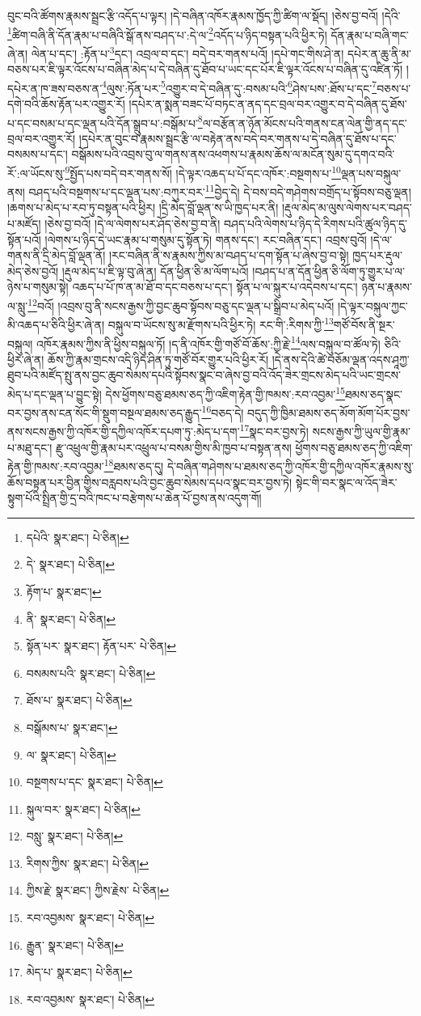 བུང་བའི་ཚོགས་རྣམས་སྦྲང་རྩི་འདོད་པ་ལྟར། །དེ་བཞིན་འཁོར་རྣམས་ཁྱོད་ཀྱི་ཚིག་ལ་སྡོད། །ཅེས་བྱ་བའོ། །དེའི་\footnote{དཔེའི་  སྣར་ཐང་།  པེ་ཅིན། }ཚིག་བཞི་ནི་དོན་རྣམ་པ་བཞིའི་སྒོ་ནས་བཤད་པ་:དེ་ལ་\footnote{དེ་  སྣར་ཐང་།  པེ་ཅིན། }འདོད་པ་ཉིད་བསྟན་པའི་ཕྱིར་ཏེ། དོན་རྣམ་པ་བཞི་གང་ཞེ་ན། ལེན་པ་དང་། :རྟོན་པ་\footnote{རྟོག་པ་  སྣར་ཐང་། }དང་། འབྲལ་བ་དང་། བདེ་བར་གནས་པའོ། །དཔེ་གང་གིས་ཤེ་ན། དཔེར་ན་ཆུ་ནི་མ་བཅས་པར་ཇི་ལྟར་འོངས་པ་བཞིན་མེད་པ་དེ་བཞིན་དུ་ཐོབ་པ་ཡང་དང་པོར་ཇི་ལྟར་འོངས་པ་བཞིན་དུ་འཛིན་ཏོ། །དཔེར་ན་ཁ་ཟས་བཅས་ན་\footnote{ནི་  སྣར་ཐང་།  པེ་ཅིན། }ལུས་:ཏོན་པར་\footnote{སྟོན་པར་  སྣར་ཐང་། རྟོན་པར་  པེ་ཅིན། }འགྱུར་བ་དེ་བཞིན་དུ་:བསམ་པའི་\footnote{བསམས་པའི་  སྣར་ཐང་།  པེ་ཅིན། }ཤེས་པས་:ཐོས་པ་དང་\footnote{ཐོས་པ་  སྣར་ཐང་།  པེ་ཅིན། }བཅས་པ་དགེ་བའི་ཆོས་རྟོན་པར་འགྱུར་རོ། །དཔེར་ན་སྨན་བཟང་པོ་བཏང་ན་ནད་དང་བྲལ་བར་འགྱུར་བ་དེ་བཞིན་དུ་ཐོས་པ་དང་བསམ་པ་དང་ལྡན་པའི་དོན་སྒྲུབ་པ་:བསྒོམ་པ་\footnote{བསྒོམས་པ་  སྣར་ཐང་། }ལ་བརྩོན་ན་ཉོན་མོངས་པའི་གནས་ངན་ལེན་གྱི་ནད་དང་བྲལ་བར་འགྱུར་རོ། །དཔེར་ན་བུང་བ་རྣམས་སྦྲང་རྩི་ལ་བརྟེན་ནས་བདེ་བར་གནས་པ་དེ་བཞིན་དུ་ཐོས་པ་དང་བསམས་པ་དང་། བསྒོམས་པའི་འབྲས་བུ་ལ་གནས་ནས་འཕགས་པ་རྣམས་ཆོས་ལ་མངོན་སུམ་དུ་དགའ་བའི་རོ་:ལ་ཡོངས་སུ་\footnote{ལ་  སྣར་ཐང་།  པེ་ཅིན། }སྤྱོད་པས་བདེ་བར་གནས་སོ། །དེ་ལྟར་འཆད་པ་པོ་དང་འཁོར་:བསྔགས་པ་\footnote{བསྔགས་པ་དང་  སྣར་ཐང་།  པེ་ཅིན། }ལྡན་པས་བསྐུལ་ནས། བཤད་པའི་བསྔགས་པ་དང་ལྡན་པས་:བཀུར་བར་\footnote{སྐུལ་བར་  སྣར་ཐང་།  པེ་ཅིན། }བྱེད་དེ། དེ་བས་བདེ་གཤེགས་བགྲོད་པ་སྟོབས་བཅུ་ལྡན། །ཆགས་པ་མེད་པ་རབ་ཏུ་བསྟན་པའི་ཕྱིར། །དྲི་མེད་བློ་ལྡན་ས་ཡི་ཁྱད་པར་ནི། །རྡུལ་མེད་མ་ལུས་ལེགས་པར་བཤད་པ་མཛོད། །ཅེས་བྱ་བའོ། །དེ་ལ་ལེགས་པར་ཤོད་ཅེས་བྱ་བ་ནི། བཤད་པའི་ལེགས་པ་ཉིད་དེ་རིགས་པའི་ཚུལ་ཉིད་དུ་སྟོན་པའོ། །ལེགས་པ་ཉིད་དེ་ཡང་རྣམ་པ་གསུམ་དུ་སྟོན་ཏེ། གནས་དང་། རང་བཞིན་དང་། འབྲས་བུའོ། །དེ་ལ་གནས་ནི་དྲི་མེད་བློ་ལྡན་ནོ། །རང་བཞིན་ནི་ས་རྣམས་ཀྱིས་མ་བཤད་པ་དག་སྟོན་པ་ཞེས་བྱ་བ་སྟེ། ཁྱད་པར་རྡུལ་མེད་ཅེས་བྱའོ། །རྡུལ་མེད་པ་ཇི་ལྟ་བུ་ཞེ་ན། དོན་ཕྱིན་ཅི་མ་ལོག་པའོ། །བཤད་པ་ན་དོན་ཕྱིན་ཅི་ལོག་ཏུ་གྱུར་པ་ལ་ཉེས་པ་གསུམ་སྟེ། འཆད་པ་པོ་ཁ་ན་མ་ཐོ་བ་དང་བཅས་པ་དང་། སྟོན་པ་ལ་སྐུར་པ་འདེབས་པ་དང་། ཉན་པ་རྣམས་ལ་སླུ་\footnote{བསླུ་  སྣར་ཐང་།  པེ་ཅིན། }བའོ། །འབྲས་བུ་ནི་སངས་རྒྱས་ཀྱི་བྱང་ཆུབ་སྟོབས་བཅུ་དང་ལྡན་པ་སྒྲིབ་པ་མེད་པའོ། །དེ་ལྟར་བསྐུལ་ཀྱང་མི་འཆད་པ་ཅིའི་ཕྱིར་ཞེ་ན། བསྐུལ་བ་ཡོངས་སུ་མ་རྫོགས་པའི་ཕྱིར་ཏེ། རང་གི་:རིགས་ཀྱི་\footnote{རིགས་ཀྱིས་  སྣར་ཐང་།  པེ་ཅིན། }གཙོ་བོས་ནི་སྔར་བསྐུལ། འཁོར་རྣམས་ཀྱིས་ནི་ཕྱིས་བསྐུལ་ཏོ། །ད་ནི་འཁོར་གྱི་གཙོ་བོ་ཆོས་:ཀྱི་རྗེ་\footnote{ཀྱིས་རྗེ་  སྣར་ཐང་། ཀྱིས་རྗེས་  པེ་ཅིན། }ལས་བསྐུལ་བ་ཚོལ་ཏེ། ཅིའི་ཕྱིར་ཞེ་ན། ཆོས་ཀྱི་རྣམ་གྲངས་འདི་ཉིད་ཤིན་ཏུ་གཙོ་བོར་གྱུར་པའི་ཕྱིར་རོ། །དེ་ནས་དེའི་ཚེ་བཅོམ་ལྡན་འདས་ཤཱཀྱ་ཐུབ་པའི་མཛོད་སྤུ་ནས་བྱང་ཆུབ་སེམས་དཔའི་སྟོབས་སྣང་བ་ཞེས་བྱ་བའི་འོད་ཟེར་གྲངས་མེད་པའི་ཡང་གྲངས་མེད་པ་དང་ལྡན་པ་བྱུང་སྟེ། དེས་ཕྱོགས་བཅུ་ཐམས་ཅད་ཀྱི་འཇིག་རྟེན་གྱི་ཁམས་:རབ་འབྱམ་\footnote{རབ་འབྱམས་  སྣར་ཐང་།  པེ་ཅིན། }ཐམས་ཅད་སྣང་བར་བྱས་ནས་ངན་སོང་གི་སྡུག་བསྔལ་ཐམས་ཅད་རྒྱུད་\footnote{རྒྱུན་  སྣར་ཐང་།  པེ་ཅིན། }བཅད་དེ། བདུད་ཀྱི་ཁྱིམ་ཐམས་ཅད་མོག་མོག་པོར་བྱས་ནས་སངས་རྒྱས་ཀྱི་འཁོར་གྱི་དཀྱིལ་འཁོར་དཔག་ཏུ་:མེད་པ་དག་\footnote{མེད་པ་  སྣར་ཐང་།  པེ་ཅིན། }སྣང་བར་བྱས་ཏེ། སངས་རྒྱས་ཀྱི་ཡུལ་གྱི་རྣམ་པ་མཐུ་དང་། རྫུ་འཕྲུལ་གྱི་རྣམ་པར་འཕྲུལ་པ་བསམ་གྱིས་མི་ཁྱབ་པ་བསྟན་ནས། ཕྱོགས་བཅུ་ཐམས་ཅད་ཀྱི་འཇིག་རྟེན་གྱི་ཁམས་:རབ་འབྱམ་\footnote{རབ་འབྱམས་  སྣར་ཐང་།  པེ་ཅིན། }ཐམས་ཅད་དུ། དེ་བཞིན་གཤེགས་པ་ཐམས་ཅད་ཀྱི་འཁོར་གྱི་དཀྱིལ་འཁོར་རྣམས་སུ་ཆོས་བསྟན་པར་བྱིན་གྱིས་བརླབས་པའི་བྱང་ཆུབ་སེམས་དཔའ་སྣང་བར་བྱས་ཏེ། སྟེང་གི་བར་སྣང་ལ་འོད་ཟེར་སྟུག་པོའི་སྤྲིན་གྱི་དྲ་བའི་ཁང་པ་བརྩེགས་པ་ཆེན་པོ་བྱས་ནས་འདུག་གོ། 